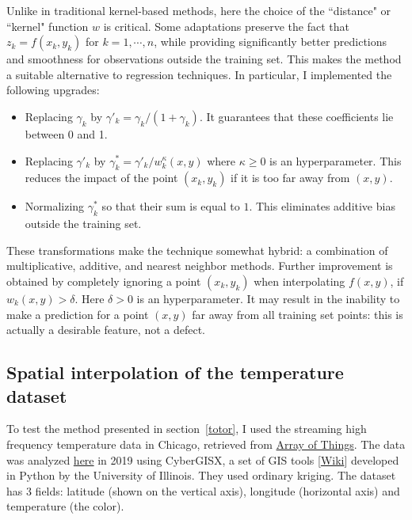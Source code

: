 \documentclass[oneside,10pt]{book}
\begin{document}
Unlike in traditional kernel-based methods, here the choice of the ``distance" or ``kernel" function $w$ is critical. Some adaptations preserve the fact that $z_k=f(x_k,y_k)$ for $k=1,\cdots,n$, while providing significantly better predictions and smoothness for observations outside the training set. This makes the method a suitable alternative to regression techniques. In particular, I implemented the following upgrades: \vspace{1ex}
\begin{itemize}
\item Replacing $\gamma_k$ by $\gamma'_k = \gamma_k /(1 + \gamma_k)$. It guarantees that these coefficients lie between 0 and 1.
\item Replacing $\gamma'_k$ by $\gamma^*_k = \gamma'_k / w_k^\kappa(x,y)$ where $\kappa\geq 0$ is an hyperparameter. This reduces the impact of the point $(x_k,y_k)$ if it is too far away from $(x,y)$.
\item Normalizing $\gamma^*_k$ so that their sum is equal to $1$. This eliminates additive bias outside the training set.
\end{itemize}\vspace{1ex}

\noindent These transformations make the technique somewhat hybrid: a combination of multiplicative, additive, and nearest neighbor methods. Further improvement is obtained by completely ignoring a point $(x_k,y_k)$ when interpolating $f(x,y)$, if
$w_k(x,y)>\delta$. Here $\delta > 0$ is an hyperparameter. It may result in the inability to make a prediction for a point $(x,y)$ far away from all training set points: this is actually a desirable feature, not a defect.

\subsection{Spatial interpolation of the temperature dataset}\label{tptyr}

To test the method presented in section~\ref{totor}, I used the streaming high frequency temperature data in Chicago, retrieved from \href{https://arrayofthings.github.io/}{Array of Things}. The data was analyzed \href{https://cybergisxhub.cigi.illinois.edu/notebook/spatial-interpolation/}{here}
in 2019 using CyberGISX, a set of \textcolor{index}{GIS} tools
[\href{https://en.wikipedia.org/wiki/Geographic_information_system}{Wiki}] developed in Python by the University of Illinois. They used ordinary kriging.  The dataset has 3 fields: latitude (shown on the vertical axis), longitude (horizontal axis) and temperature (the color).
\end{document}
